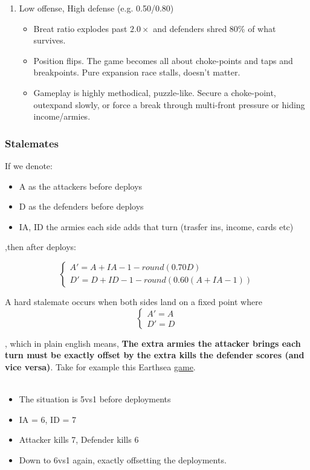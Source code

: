 \begin{enumerate}
\begin{itemize}
    \end{itemize}
    \item Low offense, High defense (e.g. 0.50/0.80)
    \begin{itemize}
        \item Breat ratio explodes past $2.0 \times$ and defenders shred 80\% of what survives. 
        \item Position flips. The game becomes all about choke-points and taps and breakpoints. Pure expansion race stalls, doesn't matter.
        \item Gameplay is highly methodical, puzzle-like. Secure a choke-point, outexpand slowly, or force a break through multi-front pressure or hiding income/armies.
    \end{itemize}
\end{enumerate}

\subsubsection{Stalemates}

If we denote:
\begin{itemize}
    \item A as the attackers before deploys
    \item D as the defenders before deploys
    \item IA, ID the armies each side adds that turn (trasfer ins, income, cards etc)
\end{itemize}

,then after deploys:


\[
\begin{cases}
A' = A + IA - 1 - round(0.70D) \\
D' = D + ID -1 - round(0.60(A+IA-1))
\end{cases}
\]

A hard stalemate occurs when both sides land on a fixed point where 
\[
\begin{cases}
A' = A \\
D' = D
\end{cases}
\]

, which in plain english means, \textbf{The extra armies the attacker brings each turn must be exactly offset by the extra kills the defender scores (and vice versa)}. Take for example this Earthsea \href{https://www.warzone.com/MultiPlayer?GameID=36770903}{game}.
\\
\\
\begin{itemize}
    \item The situation is 5vs1 before deployments
    \item IA = 6, ID = 7
    \item Attacker kills 7, Defender kills 6
    \item Down to 6vs1 again, exactly offsetting the deployments.
\end{itemize}

